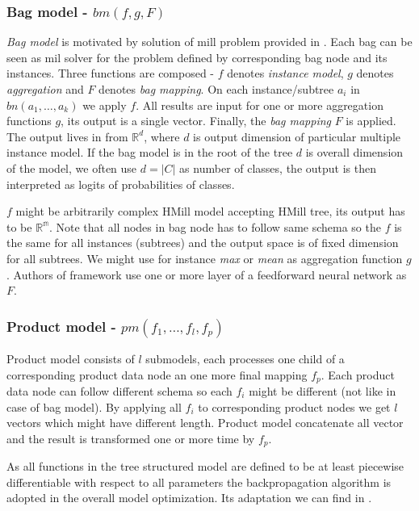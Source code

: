 \subsubsection{Bag model - $bm(f,g,F)$}
\emph{Bag model} is motivated by solution of mill problem provided in \cite{Pevny2016a}. Each bag can be seen as mil solver for the problem defined by corresponding bag node and its instances. Three functions are composed - $f$ denotes \emph{instance model}, $g$ denotes \emph{aggregation} and $F$ denotes \emph{bag mapping}. On each instance/subtree $a_i$ in $bn(a_1,\dots,a_k)$ we apply $f$. All results are input for one or more aggregation functions $g$, its output is a single vector. Finally, the \emph{bag mapping} $F$ is applied. The output lives in from $\mathbb{R}^d$, where $d$ is output dimension of particular multiple instance model. If the bag model is in the root of the tree $d$ is overall dimension of the model, we often use $d=|C|$ as number of classes, the output is then interpreted as logits of probabilities of classes.

$f$ might be arbitrarily complex HMill model accepting HMill tree, its output has to be $\mathbb{R^m}$. Note that all nodes in bag node has to follow same schema so the $f$ is the same for all instances (subtrees) and the output space is of fixed dimension for all subtrees. We might use for instance \emph{max} or \emph{mean} as aggregation function $g$. Authors of framework use one or more layer of a feedforward neural network as $F$.

\subsubsection{Product model - $pm(f_1,\dots,f_l,f_p)$}
Product model consists of $l$ submodels, each processes  one child of a corresponding product data node an one more final mapping $f_p$. Each product data node can follow different schema so each $f_i$ might be different (not like in case of bag model). By applying all $f_i$ to corresponding product nodes we get $l$ vectors which might have different length. Product model concatenate all vector and the result is transformed one or more time by $f_p$.

As all functions in the tree structured model are defined to be at least piecewise differentiable with respect to all parameters the backpropagation algorithm is adopted in the overall model optimization. Its adaptation we can find in \cite{Mandlik2020}.


